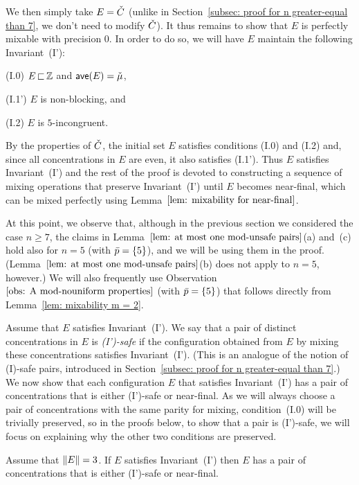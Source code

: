 We then simply take $E = {\check{C}}$ (unlike in Section~\ref{subsec: proof for n greater-equal than 7}, we 
don't need to modify ${\check{C}}$). It thus remains to show that 
$E$ is perfectly mixable with precision $0$. 
In order to do so, we will have $E$ maintain the following Invariant~(I'):
%
\begin{description}
	\item{(I.0)} $E{\,\sqsubset\,} {\mathbb Z}$ and ${\textsf{ave}}(E) = {\check{\mu}}$,
	\item{(I.1')} $E$ is non-blocking, and
	\item{(I.2)} $E$ is $5$-incongruent.
\end{description}
%
By the properties of ${\check{C}}$, the initial set $E$ satisfies conditions (I.0) and (I.2) and, since
all concentrations in $E$ are even, it also satisfies (I.1'). Thus
$E$ satisfies Invariant~(I') and the rest of the proof is devoted to constructing a
sequence of mixing operations that preserve Invariant~(I') until $E$ becomes near-final,
which can be mixed perfectly using Lemma~$\ref{lem: mixability for near-final}$.

At this point, we observe that, although in the previous section we considered the case $n \ge 7$,
the claims in Lemma~$\ref{lem: at most one mod-unsafe pairs}$(a) and~(c)
hold also for $n=5$ (with ${\bar{p}} = { \left\{ 5 \right\} }$), and we will be using them in the proof.
(Lemma~$\ref{lem: at most one mod-unsafe pairs}$(b) does not apply to $n=5$, however.)
We will also frequently use Observation~$\ref{obs: A mod-nouniform properties}$ (with ${\bar{p}} = { \left\{ 5 \right\} }$)
that follows directly from Lemma~\ref{lem: mixability m = 2}.


Assume that $E$ satisfies Invariant~(I'). We say that a pair of distinct concentrations in $E$ is \emph{(I')-safe}
if the configuration obtained from $E$ by mixing these concentrations satisfies Invariant~(I').
(This is an analogue of the notion of (I)-safe pairs, introduced in Section~\ref{subsec: proof for n greater-equal than 7}.)
We now show that each configuration $E$ that satisfies Invariant~(I') has a pair
of concentrations that is either (I')-safe or near-final.
As we will always choose a pair of concentrations with the same parity for mixing,
condition~(I.0) will be trivially preserved, so in the proofs below,
to show that a pair is (I')-safe, we will focus on
explaining why the other two conditions are preserved.

\begin{lemma}%
	\label{lem: m = 3, preserves invariant, n = 5}
	Assume that ${\|E\|}=3$.
	If $E$ satisfies Invariant~(I') then $E$ has a pair of concentrations
	that is either (I')-safe or near-final.
\end{lemma}%


